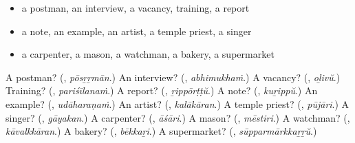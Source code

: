 \begin{itemize}
\raggedright
  \item a postman, an interview, a vacancy, training, a report
  \item a note, an example, an artist, a temple priest, a singer
  \item a carpenter, a mason, a watchman, a bakery, a supermarket
\end{itemize}

\begin{tcolorbox}[breakable,colback=teal!4,colframe=teal!35!black,title={Before you move on}]
A postman? (\textbf{}, \emph{pōsṟṟmān}.) An interview? (\textbf{}, \emph{abhimukhaṁ}.) A vacancy? (\textbf{}, \emph{oḻivŭ}.) Training? (\textbf{}, \emph{pariśīlanaṁ}.) A report? (\textbf{}, \emph{ṟippōrṭṭŭ}.) A note? (\textbf{}, \emph{kuṟippŭ}.) An example? (\textbf{}, \emph{udāharaṇaṁ}.) An artist? (\textbf{}, \emph{kalākāran}.) A temple priest? (\textbf{}, \emph{pūjāri}.) A singer? (\textbf{}, \emph{gāyakan}.) A carpenter? (\textbf{}, \emph{āśāri}.) A mason? (\textbf{}, \emph{mēstiri}.) A watchman? (\textbf{}, \emph{kāvalkkāran}.) A bakery? (\textbf{}, \emph{bēkkaṟi}.) A supermarket? (\textbf{}, \emph{sūpparmārkkaṟṟŭ}.)
\end{tcolorbox}
